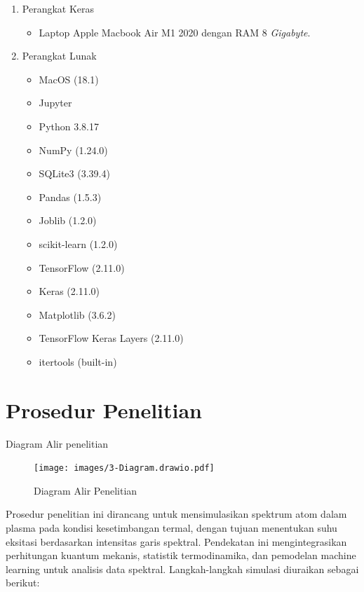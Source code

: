 \begin{enumerate}
\item Perangkat Keras
	\begin{itemize}
	\item Laptop Apple Macbook Air M1 2020 dengan RAM 8 \textit{Gigabyte}.
    \end{itemize}
\item Perangkat Lunak
	\begin{itemize}
	\item MacOS (18.1)
	\item Jupyter 
	\item Python 3.8.17
    \item NumPy (1.24.0)
    \item SQLite3 (3.39.4)
    \item Pandas (1.5.3)
    \item Joblib (1.2.0)
    \item scikit-learn (1.2.0)
    \item TensorFlow (2.11.0)
    \item Keras (2.11.0)
    \item Matplotlib (3.6.2)
    \item TensorFlow Keras Layers (2.11.0)
    \item itertools (built-in)
	\end{itemize}
\end{enumerate}

\section{Prosedur Penelitian}

\par Diagram Alir penelitian
\begin{center}
    \begin{figure}
        \centering
        \texttt{[image: images/3-Diagram.drawio.pdf]} 
        \caption{Diagram Alir Penelitian}
        \label{fig:3-diagram}
    \end{figure}
\end{center}
Prosedur penelitian ini dirancang untuk mensimulasikan spektrum atom dalam plasma pada kondisi kesetimbangan termal, dengan tujuan menentukan suhu eksitasi berdasarkan intensitas garis spektral. Pendekatan ini mengintegrasikan perhitungan kuantum mekanis, statistik termodinamika, dan pemodelan machine learning untuk analisis data spektral. Langkah-langkah simulasi diuraikan sebagai berikut:


